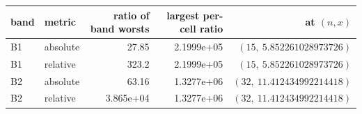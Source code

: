 \begin{tabular}{llrrr}
\toprule
band & metric & ratio of band worsts & largest per-cell ratio & at $(n,x)$\\
\midrule
B1 & absolute & 27.85 & 2.1999e+05 & $(15,\ 5.852261028973726)$\\
B1 & relative & 323.2 & 2.1999e+05 & $(15,\ 5.852261028973726)$\\
B2 & absolute & 63.16 & 1.3277e+06 & $(32,\ 11.412434992214418)$\\
B2 & relative & 3.865e+04 & 1.3277e+06 & $(32,\ 11.412434992214418)$\\
\bottomrule
\end{tabular}
